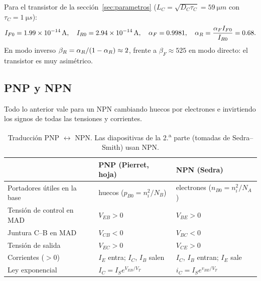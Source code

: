 \begin{ejemplo}
Para el transistor de la sección~\ref{sec:parametros} ($L_C=\sqrt{D_C\tau_C}=\SI{59}{\micro m}$ con
$\tau_C=\SI{1}{\micro s}$):
\[
  I_{F0}=\SI{1.99e-14}{A},\quad I_{R0}=\SI{2.94e-14}{A},\quad
  \alpha_F=0.9981,\quad \alpha_R=\frac{\alpha_F I_{F0}}{I_{R0}}=0.68 .
\]
En modo inverso $\beta_R=\alpha_R/(1-\alpha_R)\approx2$, frente a $\beta_F\approx525$ en modo directo:
el transistor es muy asimétrico.
\end{ejemplo}

\subsection{PNP y NPN}

Todo lo anterior vale para un NPN cambiando huecos por electrones e invirtiendo los signos
de todas las tensiones y corrientes.

\begin{table}[H]
\centering\small
\caption{Traducción PNP $\leftrightarrow$ NPN. Las diapositivas de la 2.\textsuperscript{a} parte
(tomadas de Sedra--Smith) usan NPN.}
\label{tab:pnp-npn}
\begin{tabular}{lll}
\toprule
 & PNP (Pierret, hoja) & NPN (Sedra) \\
\midrule
Portadores útiles en la base & huecos ($p_{B0}=n_i^2/N_B$) & electrones ($n_{B0}=n_i^2/N_A$) \\
Tensión de control en MAD & $V_{EB}>0$ & $V_{BE}>0$ \\
Juntura C--B en MAD & $V_{CB}<0$ & $V_{BC}<0$ \\
Tensión de salida & $V_{EC}>0$ & $V_{CE}>0$ \\
Corrientes ($>0$) & $I_E$ entra; $I_C$, $I_B$ salen & $I_C$, $I_B$ entran; $I_E$ sale \\
Ley exponencial & $I_C=I_Se^{V_{EB}/V_T}$ & $i_C=I_Se^{v_{BE}/V_T}$ \\
\bottomrule
\end{tabular}
\end{table}
